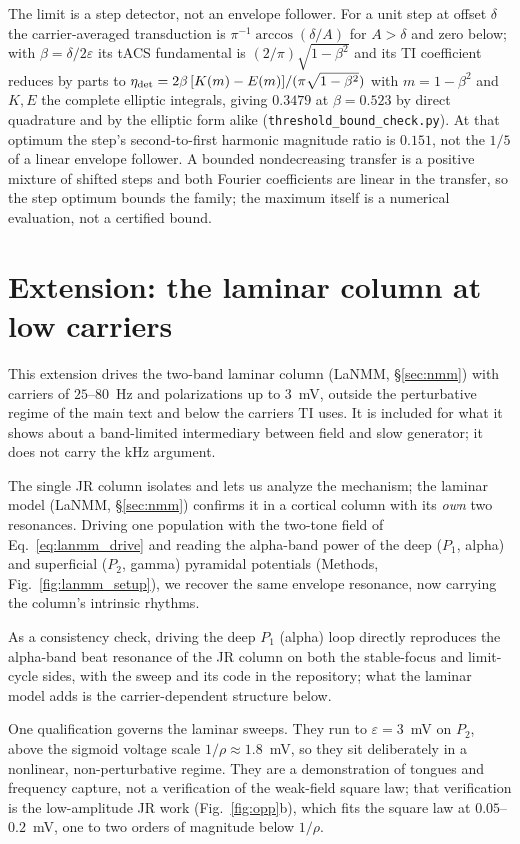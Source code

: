 \documentclass[11pt,a4paper]{article}
\begin{document}
The limit is a step detector, not an envelope follower. For a unit step at offset
$\delta$ the carrier-averaged transduction is $\pi^{-1}\arccos(\delta/A)$ for $A>\delta$
and zero below; with $\beta=\delta/2\varepsilon$ its tACS fundamental is
$(2/\pi)\sqrt{1-\beta^2}$ and its TI coefficient reduces by parts to
$\eta_{\rm det}=2\beta\,[K(m)-E(m)]/(\pi\sqrt{1-\beta^2})$ with $m=1-\beta^2$ and $K,E$
the complete elliptic integrals, giving $0.3479$ at $\beta=0.523$ by direct quadrature and
by the elliptic form alike (\texttt{threshold\_bound\_check.py}). At that optimum the
step's second-to-first harmonic magnitude ratio is $0.151$, not the $1/5$ of a linear
envelope follower. A bounded nondecreasing transfer is a positive mixture of shifted steps
and both Fourier coefficients are linear in the transfer, so the step optimum bounds the
family; the maximum itself is a numerical evaluation, not a certified bound.

\section{Extension: the laminar column at low carriers}\label{app:lanmm}
\label{sec:lanmm-results}
This extension drives the two-band laminar column (LaNMM, \S\ref{sec:nmm}) with carriers
of $25$--$80$~Hz and polarizations up to $3$~mV, outside the perturbative regime of the
main text and below the carriers TI uses. It is included for what it shows about a
band-limited intermediary between field and slow generator; it does not carry the kHz
argument.

The single JR column isolates and lets us analyze the mechanism; the laminar model
(LaNMM, \S\ref{sec:nmm}) confirms it in a cortical column with its \emph{own} two
resonances. Driving one population with the two-tone field of Eq.~\eqref{eq:lanmm_drive}
and reading the alpha-band power of the deep ($P_1$, alpha) and superficial ($P_2$,
gamma) pyramidal potentials (Methods, Fig.~\ref{fig:lanmm_setup}), we recover the
same envelope resonance, now carrying the column's intrinsic rhythms.

As a consistency check, driving the deep $P_1$ (alpha) loop directly reproduces the
alpha-band beat resonance of the JR column on both the stable-focus and limit-cycle sides,
with the sweep and its code in the repository; what the laminar model adds is the
carrier-dependent structure below.

One qualification governs the laminar sweeps. They run to $\varepsilon=3$~mV on $P_2$,
above the sigmoid voltage scale $1/\rho\approx1.8$~mV, so they sit deliberately in a
nonlinear, non-perturbative regime. They are a demonstration of tongues and frequency
capture, not a verification of the weak-field square law; that verification is the
low-amplitude JR work (Fig.~\ref{fig:opp}b), which fits the square law at
$0.05$--$0.2$~mV, one to two orders of magnitude below $1/\rho$.
\end{document}
